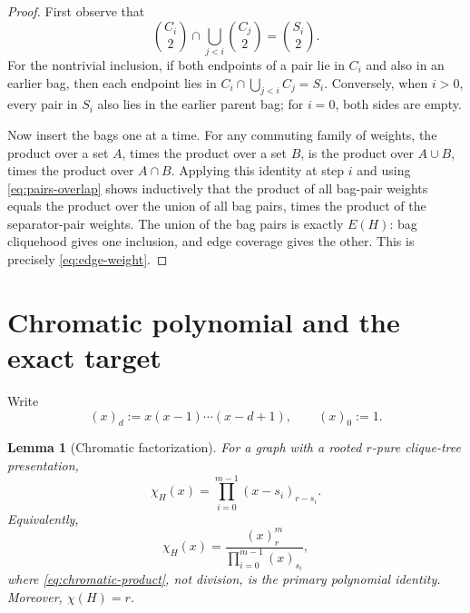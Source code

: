 \documentclass[11pt]{article}
\newtheorem{lemma}{Lemma}
\begin{document}
\begin{proof}
First observe that
\begin{equation}\label{eq:pairs-overlap}
    \binom{C_i}{2}
    \cap
    \bigcup_{j<i}\binom{C_j}{2}
    =
    \binom{S_i}{2}.
\end{equation}
For the nontrivial inclusion, if both endpoints of a pair lie in \(C_i\) and
also in an earlier bag, then each endpoint lies in
\(C_i\cap\bigcup_{j<i}C_j=S_i\).  Conversely, when \(i>0\), every pair in
\(S_i\) also lies in the earlier parent bag; for \(i=0\), both sides are
empty.

Now insert the bags one at a time.  For any commuting family of weights,
the product over a set \(A\), times the product over a set \(B\), is the
product over \(A\cup B\), times the product over \(A\cap B\).  Applying this
identity at step \(i\) and using \eqref{eq:pairs-overlap} shows inductively
that the product of all bag-pair weights equals the product over the union of
all bag pairs, times the product of the separator-pair weights.  The union of
the bag pairs is exactly \(E(H)\): bag cliquehood gives one inclusion, and
edge coverage gives the other.  This is precisely \eqref{eq:edge-weight}.
\end{proof}

\section{Chromatic polynomial and the exact target}

Write
\[
    (x)_d:=x(x-1)\cdots(x-d+1),
    \qquad (x)_0:=1.
\]

\begin{lemma}[Chromatic factorization]\label{lem:chromatic}
For a graph with a rooted \(r\)-pure clique-tree presentation,
\begin{equation}\label{eq:chromatic-product}
    \chi_H(x)
    =
    \prod_{i=0}^{m-1}(x-s_i)_{r-s_i}.
\end{equation}
Equivalently,
\begin{equation}\label{eq:chromatic-quotient}
    \chi_H(x)
    =
    \frac{(x)_r^m}{\prod_{i=0}^{m-1}(x)_{s_i}},
\end{equation}
where \eqref{eq:chromatic-product}, not division, is the primary polynomial
identity.  Moreover, \(\chi(H)=r\).
\end{lemma}
\end{document}

